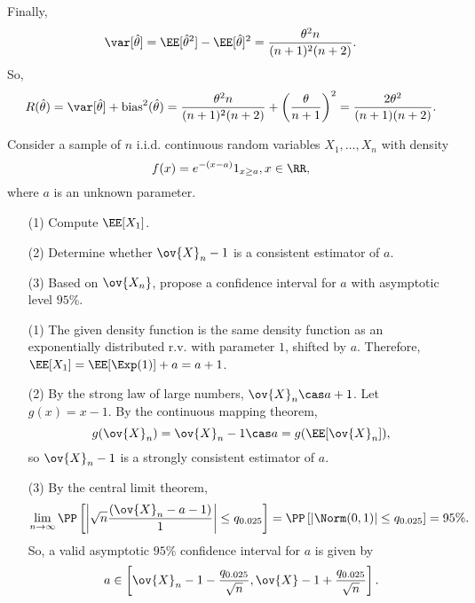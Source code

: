 Finally,
\begin{align*}
    \var[\hat{\theta}] = \EE[\hat{\theta}^2] - \EE[\hat{\theta}]^2 = \frac{\theta^2n}{(n+1)^2(n+2)}.
\end{align*}
So,
\begin{align*}
    R(\hat{\theta}) = \var[\hat{\theta}] + \text{bias}^2(\hat{\theta}) = \frac{\theta^2n}{(n+1)^2(n+2)} + \left(\frac{\theta}{n+1}\right)^2 = \frac{2\theta^2}{(n+1)(n+2)}.
\end{align*}

\begin{example}
\exlabel

Consider a sample of $n$ i.i.d. continuous random variables $X_1, \hdots, X_n$ with density 
\[f(x) = e^{-(x-a)}1_{x\geq a}, x\in \RR,\]
where $a$ is an unknown parameter. 
\begin{enumerate}
\setlength\itemsep{0cm}
    \item [(1)] Compute $\EE[X_1]$.
    \item [(2)] Determine whether $\ov{X}_n-1$ is a consistent estimator of $a$.
    \item [(3)] Based on $\ov{X_n}$, propose a confidence interval for $a$ with asymptotic level $95\%$. 
\end{enumerate}
\end{example}

\begin{enumerate}
    \item [(1)] The given density function is the same density function as an exponentially distributed r.v. with parameter $1$, shifted by $a$. Therefore, $\EE[X_1] = \EE[\Exp(1)]+a = a+1$.
    \item [(2)] By the strong law of large numbers, $\ov{X}_n\cas a+1$. Let $g(x) = x-1$. By the continuous mapping theorem, \[g(\ov{X}_n) = \ov{X}_n-1 \cas a = g(\EE[\ov{X}_n]),\] so $\ov{X}_n-1$ is a strongly consistent estimator of $a$. 
    \item [(3)] By the central limit theorem, 
    \[\lim_{n\rightarrow \infty}\PP\left[\left\vert \sqrt{n}\frac{(\ov{X}_n - a - 1)}{1}\right\vert \leq q_{0.025}\right] = \PP\left[\vert \Norm(0,1)\vert \leq q_{0.025}\right] = 95\%.\]
    So, a valid asymptotic $95\%$ confidence interval for $a$ is given by
    \[a\in \left[\ov{X}_n-1-\frac{q_{0.025}}{\sqrt{n}}, \ov{X}-1+\frac{q_{0.025}}{\sqrt{n}}\right].\]
\end{enumerate}

